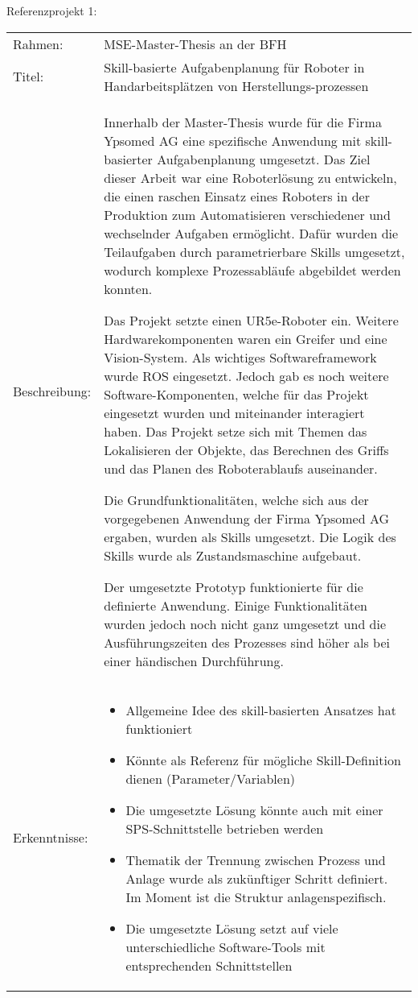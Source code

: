	Referenzprojekt 1:
	\vspace{2mm}
	\\
	\begin{tabularx}{\textwidth}{@{}>{}p{8em} X@{}}
		Rahmen: & 
		MSE-Master-Thesis an der BFH
		\\
		
		Titel: & 
		Skill-basierte Aufgabenplanung für Roboter in Handarbeitsplätzen von Herstellungs-prozessen 
		\\
		
		Beschreibung: & 
		Innerhalb der Master-Thesis wurde für die Firma Ypsomed AG eine spezifische Anwendung mit skill-basierter Aufgabenplanung umgesetzt. Das Ziel dieser Arbeit war eine Roboterlösung zu entwickeln, die einen raschen Einsatz eines Roboters in der Produktion zum Automatisieren verschiedener und wechselnder Aufgaben ermöglicht. Dafür wurden die Teilaufgaben durch parametrierbare Skills umgesetzt, wodurch komplexe Prozessabläufe abgebildet werden konnten.
		
		Das Projekt setzte einen UR5e-Roboter ein. Weitere Hardwarekomponenten waren ein Greifer und eine Vision-System. Als wichtiges Softwareframework wurde ROS eingesetzt. Jedoch gab es noch weitere Software-Komponenten, welche für das Projekt eingesetzt wurden und miteinander interagiert haben. Das Projekt setze sich mit Themen das Lokalisieren der Objekte, das Berechnen des Griffs und das Planen des Roboterablaufs auseinander.
		
		Die Grundfunktionalitäten, welche sich aus der vorgegebenen Anwendung der Firma Ypsomed AG ergaben, wurden als Skills umgesetzt. Die Logik des Skills wurde als Zustandsmaschine aufgebaut. 
		
		Der umgesetzte Prototyp funktionierte für die definierte Anwendung. Einige Funktionalitäten wurden jedoch noch nicht ganz umgesetzt und die Ausführungszeiten des Prozesses sind höher als bei einer händischen Durchführung. 
		\\
		
		Erkenntnisse: & 
		\begin{itemize}
			\item Allgemeine Idee des skill-basierten Ansatzes hat funktioniert
			\item Könnte als Referenz für mögliche Skill-Definition dienen (Parameter/Variablen)
			\item Die umgesetzte Lösung könnte auch mit einer SPS-Schnittstelle betrieben werden
			\item Thematik der Trennung zwischen Prozess und Anlage wurde als zukünftiger Schritt definiert. Im Moment ist die Struktur anlagenspezifisch.
			\item Die umgesetzte Lösung setzt auf viele unterschiedliche Software-Tools mit entsprechenden Schnittstellen
		\end{itemize}
	\end{tabularx}
	
